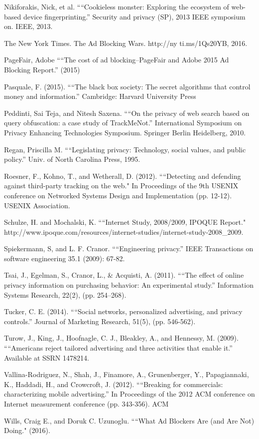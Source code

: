 \documentclass[conference]{IEEEtran}
\begin{document}
\begin{thebibliography}{99}
 Nikiforakis, Nick, et al. ““Cookieless monster: Exploring the ecosystem of web-based device fingerprinting.” Security and privacy (SP), 2013 IEEE symposium on. IEEE, 2013.

 The New York Times. The Ad Blocking Wars. http://ny ti.ms/1Qs20YB, 2016.

 PageFair, Adobe ““The cost of ad blocking–PageFair and Adobe 2015 Ad Blocking Report.” (2015)

 Pasquale, F. (2015). ““The black box society: The secret algorithms that control money and information.” Cambridge: Harvard University Press

 Peddinti, Sai Teja, and Nitesh Saxena. ““On the privacy of web search based on query obfuscation: a case study of TrackMeNot.” International Symposium on Privacy Enhancing Technologies Symposium. Springer Berlin Heidelberg, 2010.

 Regan, Priscilla M. ““Legislating privacy: Technology, social values, and public policy.” Univ. of North Carolina Press, 1995.

 Roesner, F., Kohno, T., and Wetherall, D. (2012). ““Detecting and defending against third-party tracking on the web." In Proceedings of the 9th USENIX conference on Networked Systems Design and Implementation (pp. 12-12). USENIX Association.

 Schulze, H. and Mochalski, K. ““Internet Study, 2008/2009, IPOQUE Report."
http://www.ipoque.com/resources/internet-studies/internet-study-2008\_2009.

 Spiekermann, S, and L. F. Cranor. ““Engineering privacy.” IEEE Transactions on software engineering 35.1 (2009): 67-82.

 Tsai, J., Egelman, S., Cranor, L., \& Acquisti, A. (2011). ““The effect of online privacy information on purchasing behavior: An experimental study.” Information Systems Research, 22(2), (pp. 254–268).

 Tucker, C. E. (2014). ““Social networks, personalized advertising, and privacy controls.” Journal of Marketing Research, 51(5), (pp. 546-562).

 Turow, J., King, J., Hoofnagle, C. J., Bleakley, A., and Hennessy, M. (2009). ““Americans reject tailored advertising and three activities that enable it.” Available at SSRN 1478214.

 Vallina-Rodriguez, N., Shah, J., Finamore, A., Grunenberger, Y., Papagiannaki, K., Haddadi, H., and Crowcroft, J. (2012). ““Breaking for commercials: characterizing mobile advertising.” In Proceedings of the 2012 ACM conference on Internet measurement conference (pp. 343-356). ACM

 Wills, Craig E., and Doruk C. Uzunoglu. ““What Ad Blockers Are (and Are Not) Doing." (2016).

\end{thebibliography}
\end{document}
